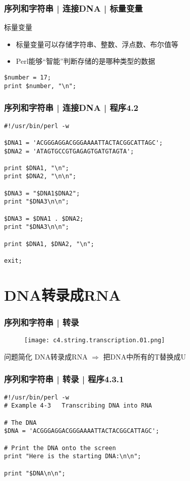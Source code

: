\begin{frame}[fragile]
  \frametitle{序列和字符串 | 连接DNA | 标量变量}
  \begin{block}{标量变量}
    \begin{itemize}
      \item 标量变量可以存储字符串、整数、浮点数、布尔值等
      \item Perl能够“智能”判断存储的是哪种类型的数据
    \end{itemize}
  \end{block}
  \pause
\begin{lstlisting}
$number = 17;
print $number, "\n";
\end{lstlisting}
\end{frame}

\begin{frame}[fragile]
  \frametitle{序列和字符串 | 连接DNA | \alert{程序4.2}}
\begin{lstlisting}[basicstyle=\small\tt]
#!/usr/bin/perl -w

$DNA1 = 'ACGGGAGGACGGGAAAATTACTACGGCATTAGC';
$DNA2 = 'ATAGTGCCGTGAGAGTGATGTAGTA';

print $DNA1, "\n";
print $DNA2, "\n\n";

$DNA3 = "$DNA1$DNA2";
print "$DNA3\n\n";

$DNA3 = $DNA1 . $DNA2;
print "$DNA3\n\n";

print $DNA1, $DNA2, "\n";

exit;
\end{lstlisting}
\end{frame}

\section{DNA转录成RNA}
\begin{frame}
  \frametitle{序列和字符串 | 转录}
  \begin{figure}
    \centering
    \texttt{[image: c4.string.transcription.01.png]}
  \end{figure}
  \pause
  \begin{block}{问题简化}
    DNA转录成RNA $\Longrightarrow$ 把DNA中所有的T替换成U
  \end{block}
\end{frame}

\begin{frame}[fragile,label=exam4.3.1]
  \frametitle{序列和字符串 | 转录 | 程序4.3.1}
\begin{lstlisting}
#!/usr/bin/perl -w
# Example 4-3   Transcribing DNA into RNA

# The DNA
$DNA = 'ACGGGAGGACGGGAAAATTACTACGGCATTAGC';

# Print the DNA onto the screen
print "Here is the starting DNA:\n\n";

print "$DNA\n\n";
\end{lstlisting}
\end{frame}

